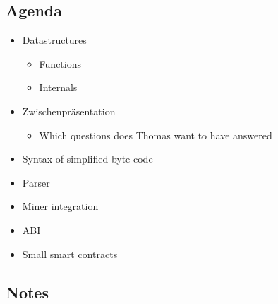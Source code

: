 \subsection{Agenda}
\begin{itemize}
\item
  Datastructures

  \begin{itemize}
  \item
    Functions
  \item
    Internals
  \end{itemize}
\item
  Zwischenpräsentation

  \begin{itemize}
  \item
    Which questions does Thomas want to have answered
  \end{itemize}
\item
  Syntax of simplified byte code
\item
  Parser
\item
  Miner integration
\item
  ABI
\item
  Small smart contracts
\end{itemize}

\subsection{Notes}

